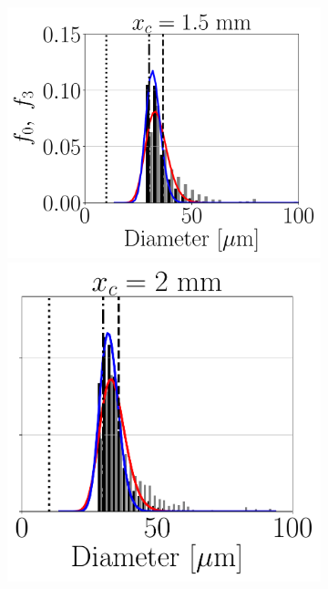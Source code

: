 \begin{figure}[ht]
\flushleft

\begin{subfigure}[b]{1.1\textwidth}
	\flushleft
   \includegraphics[scale=0.28]{./part3_applications/figures_ch8_resolved/SPRAY_characterization/histograms_size_volume/DX10_xD05p00_histograms}
   \hspace*{-0.15in}
   \includegraphics[scale=0.28]{./part3_applications/figures_ch8_resolved/SPRAY_characterization/histograms_size_volume/DX10_xD06p67_histograms}

\end{subfigure}
\end{figure}

